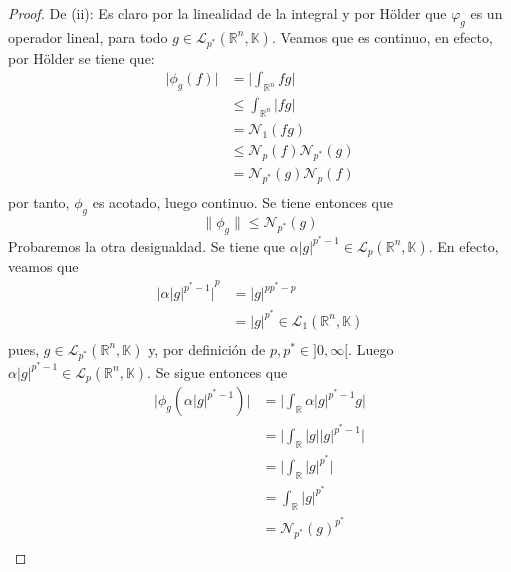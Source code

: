 \documentclass[12pt]{report}
\theoremstyle{largebreak}
\newcommand\abs[1]{\ensuremath{\big|#1\big|}}
\newcommand{\N}[2]{\ensuremath{\mathcal{N}_{#1}\left(#2\right)}}
\begin{document}
\begin{proof}
        De (ii): Es claro por la linealidad de la integral y por Hölder que $\varphi_g$ es un operador lineal, para todo $g\in\mathcal{L}_{p^*}(\mathbb{R}^n,\mathbb{K})$. Veamos que es continuo, en efecto, por Hölder se tiene que:
        \begin{equation*}
            \begin{split}
                \abs{\phi_g(f)}&=\abs{\int_{\mathbb{R}^n}fg}\\
                 &\leq\int_{\mathbb{R}^n}\abs{fg}\\
                 &=\N{1}{fg}\\
                 &\leq\N{p}{f}\N{p^*}{g}\\
                 &=\N{p^*}{g}\N{p}{f}\\
            \end{split}
        \end{equation*}
        por tanto, $\phi_g$ es acotado, luego continuo. Se tiene entonces que
        \begin{equation*}
            \|\phi_g\|\leq\N{p^*}{g}
        \end{equation*}
        Probaremos la otra desigualdad. Se tiene que $\alpha\abs{g}^{ p^*-1}\in\mathcal{L}_p(\mathbb{R}^n,\mathbb{K})$. En efecto, veamos que
        \begin{equation*}
            \begin{split}
                \abs{\alpha\abs{g}^{ p^*-1}}^p&=\abs{g}^{ pp^*-p}\\
                &=\abs{g}^{p^*}\in\mathcal{L}_1(\mathbb{R}^n,\mathbb{K}) \\
            \end{split}
        \end{equation*}
        pues, $g\in\mathcal{L}_{ p^*}(\mathbb{R}^n,\mathbb{K})$ y, por definición de $p,p^*\in]0,\infty[$. Luego $\alpha\abs{g}^{ p^*-1}\in\mathcal{L}_p(\mathbb{R}^n,\mathbb{K})$. Se sigue entonces que
        \begin{equation*}
            \begin{split}
                \abs{\phi_g(\alpha\abs{g}^{p^*-1})}&=\abs{\int_{\mathbb{R}}\alpha\abs{g}^{ p^*-1}g}\\
                &=\abs{\int_{\mathbb{R}}\abs{g}\abs{g}^{ p^*-1}}\\
                &=\abs{\int_{\mathbb{R}}\abs{g}^{ p^*}}\\
                &=\int_{\mathbb{R}}\abs{g}^{ p^*}\\
                &=\N{p^*}{g}^{p^*}\\

\end{split}
\end{equation*}
\end{proof}
\end{document}
